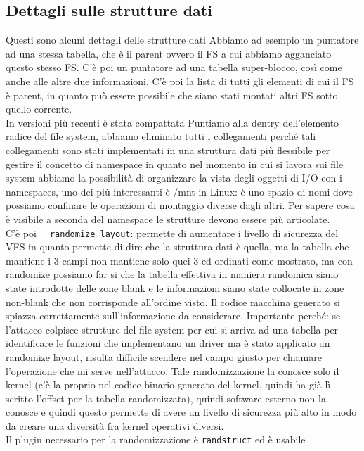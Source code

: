 \documentclass[12pt, oneside]{extbook}
\begin{document}
\subsection{Dettagli sulle strutture dati}
Questi sono alcuni dettagli delle strutture dati
Abbiamo ad esempio un puntatore ad una stessa tabella, che è il parent ovvero il FS a cui abbiamo agganciato questo stesso FS. C'è poi un puntatore ad una tabella super-blocco, così come anche alle altre due informazioni. C'è poi la lista di tutti gli elementi di cui il FS è parent, in quanto può essere possibile che siano stati montati altri FS sotto quello corrente.\\In versioni più recenti è stata compattata
Puntiamo alla dentry dell'elemento radice del file system, abbiamo eliminato tutti i collegamenti perché tali collegamenti sono stati implementati in una struttura dati più flessibile per gestire il concetto di namespace in quanto nel momento in cui si lavora sui file system abbiamo la possibilità di organizzare la vista degli oggetti di I/O con i namespaces, uno dei più interessanti è /mnt in Linux: è uno spazio di nomi dove possiamo confinare le operazioni di montaggio diverse dagli altri. Per sapere cosa è visibile a seconda del namespace le strutture devono essere più articolate.\\ C'è poi \texttt{\_\_randomize\_layout}: permette di aumentare i livello di sicurezza del VFS in quanto permette di dire che la struttura dati è quella, ma la tabella che mantiene i 3 campi non mantiene solo quei 3 ed ordinati come mostrato, ma con randomize possiamo far si che la tabella effettiva in maniera randomica siano state introdotte delle zone blank e le informazioni siano state collocate in zone non-blank che non corrisponde all'ordine visto. Il codice macchina generato si spiazza correttamente sull'informazione da considerare. Importante perché: se l'attacco colpisce strutture del file system per cui si arriva ad una tabella per identificare le funzioni che implementano un driver ma è stato applicato un randomize layout, risulta difficile scendere nel campo giusto per chiamare l'operazione che mi serve nell'attacco. Tale randomizzazione la conosce solo il kernel (c'è la proprio nel codice binario generato del kernel, quindi ha già lì scritto l'offset per la tabella randomizzata), quindi software esterno non la conosce e quindi questo permette di avere un livello di sicurezza più alto in modo da creare una diversità fra kernel operativi diversi.\\Il plugin necessario per la randomizzazione è \texttt{randstruct} ed è usabile 
\end{document}
